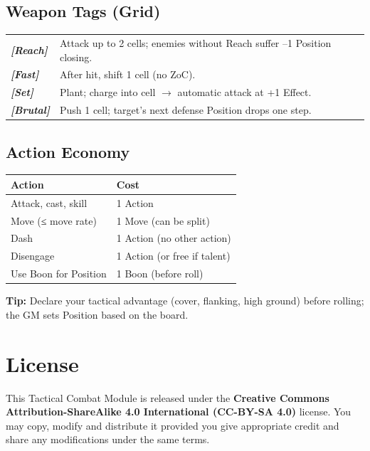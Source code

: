 \documentclass[12pt]{article}
\newcommand{\term}[1]{\textit{#1}}
\begin{document}
\subsection{Weapon Tags (Grid)}
\begin{tabularx}{\linewidth}{@{}>{\bfseries}l X}
\toprule
\term{[Reach]} & Attack up to 2 cells; enemies without Reach suffer --1 Position closing.\\
\term{[Fast]}  & After hit, shift 1 cell (no ZoC).\\
\term{[Set]}   & Plant; charge into cell $\rightarrow$ automatic attack at +1 Effect.\\
\term{[Brutal]}& Push 1 cell; target's next defense Position drops one step.\\
\bottomrule
\end{tabularx}

\subsection{Action Economy}
\begin{tabularx}{\linewidth}{@{}l X}
\toprule
\textbf{Action} & \textbf{Cost}\\
\midrule
Attack, cast, skill & 1 Action\\
Move (≤ move rate) & 1 Move (can be split)\\
Dash              & 1 Action (no other action)\\
Disengage         & 1 Action (or free if talent)\\
Use Boon for Position & 1 Boon (before roll)\\
\bottomrule
\end{tabularx}

\noindent\textbf{Tip:} Declare your tactical advantage (cover, flanking, high ground) before rolling; the GM sets Position based on the board.

\clearpage
\section*{License}
This Tactical Combat Module is released under the \textbf{Creative Commons Attribution-ShareAlike 4.0 International (CC-BY-SA 4.0)} license. You may copy, modify and distribute it provided you give appropriate credit and share any modifications under the same terms.
\end{document}
